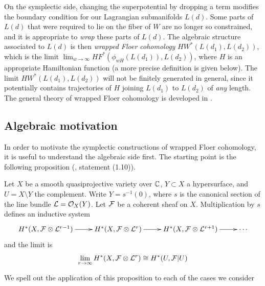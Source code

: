 \documentclass[12pt]{amsart}
\begin{document}
On the symplectic side, changing the superpotential by dropping a term
modifies the boundary condition for our Lagrangian submanifolds
$L(d)$. Some parts of $L(d)$ that were required to lie on the fiber of
$W$ are no longer so constrained, and it is appropriate to \emph{wrap}
these parts of $L(d)$. The algebraic structure associated to $L(d)$ is
then \emph{wrapped Floer cohomology} $HW^*(L(d_1),L(d_2))$, which is the
limit $\lim_{w\to \infty} HF^*(\phi_{wH}(L(d_1)),L(d_2))$, where
$H$ is an appropriate Hamiltonian function (a more precise definition
is given below). The limit
$HW^*(L(d_1),L(d_2))$ will not be finitely generated in general, since
it potentially contains trajectories of $H$ joining $L(d_1)$ to
$L(d_2)$ of \emph{any} length. The general theory of wrapped Floer
cohomology is developed in \cite{as-open-string}.



\subsection{Algebraic motivation}
\label{sec:algebraic-motivation}

In order to motivate the symplectic constructions of wrapped Floer
cohomology, it is useful to understand the algebraic side first. The
starting point is the following proposition (\cite{seidel-a-infinity-subalgebras}, statement
(1.10)).
\begin{proposition}
  Let $X$ be a smooth quasiprojective variety over $\mathbb{C}$, $Y \subset
  X$ a hypersurface, and $U = X \setminus Y$ the complement. Write $Y
  = s^{-1}(0)$, where $s$ is the canonical section of the line bundle
  $\mathcal{L} = \mathcal{O}_X(Y)$. Let $\mathcal{F}$ be a coherent sheaf on
  $X$. Multiplication by $s$ defines an inductive system
  \begin{equation}
    \xymatrix{
      H^*(X, \cF\otimes \cL^{r-1}) \ar[r] & H^*(X,\cF\otimes
      \cL^r) \ar[r]&
      H^*(X,\cF \otimes \cL^{r+1}) \ar[r] & \cdots
    }
  \end{equation}
  and the limit is
  \begin{equation}
    \lim_{r\to \infty} H^*(X,\mathcal{F}\otimes \mathcal{L}^r) \cong H^*(U , \mathcal{F}|U)
  \end{equation}
\end{proposition}

We spell out the application of this proposition to each of the cases
we consider
\end{document}
